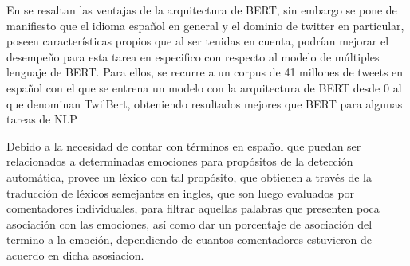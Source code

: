 En \cite{gonzalez2021twilbert} se resaltan las ventajas de la arquitectura de BERT, sin embargo se pone de manifiesto que el idioma español en general y el dominio de twitter en particular, poseen características propios que al ser tenidas en cuenta, podrían mejorar el desempeño para esta tarea en especifico con respecto al modelo de múltiples lenguaje de BERT. Para ellos, se recurre a un corpus de 41 millones de tweets en español con el que se entrena un modelo con la arquitectura de BERT desde 0 al que denominan TwilBert, obteniendo resultados mejores que BERT para algunas tareas de NLP




Debido a la necesidad de contar con términos en español que puedan ser relacionados a determinadas emociones para propósitos de la detección automática, \cite{sidorov2012empirical} provee un léxico con tal propósito, que obtienen a través de la traducción de léxicos semejantes en ingles, que son luego evaluados por comentadores individuales, para filtrar aquellas palabras que presenten poca asociación con las emociones, así como dar un porcentaje de asociación del termino a la emoción, dependiendo de cuantos comentadores estuvieron de acuerdo en dicha asosiacion.







